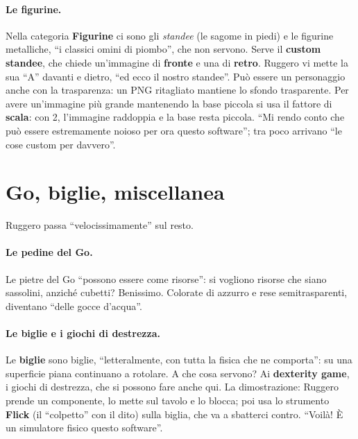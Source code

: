 \paragraph{Le figurine.} Nella categoria \textbf{Figurine} ci sono gli \emph{standee}
(le sagome in piedi) e le figurine metalliche, ``i classici omini di piombo'', che non
servono. Serve il \textbf{custom standee}, che chiede un'immagine di \textbf{fronte} e
una di \textbf{retro}. Ruggero vi mette la sua ``A'' davanti e dietro, ``ed ecco il
nostro standee''. Può essere un personaggio anche con la trasparenza: un PNG ritagliato
mantiene lo sfondo trasparente. Per avere un'immagine più grande mantenendo la base
piccola si usa il fattore di \textbf{scala}: con 2, l'immagine raddoppia e la base
resta piccola. ``Mi rendo conto che può essere estremamente noioso per ora questo
software''; tra poco arrivano ``le cose custom per davvero''.

\section{Go, biglie, miscellanea}
\label{a8:sec:misc}

Ruggero passa ``velocissimamente'' sul resto.

\paragraph{Le pedine del Go.} Le pietre del Go ``possono essere come risorse'': si
vogliono risorse che siano sassolini, anziché cubetti? Benissimo. Colorate di azzurro
e rese semitrasparenti, diventano ``delle gocce d'acqua''.

\paragraph{Le biglie e i giochi di destrezza.} Le \textbf{biglie} sono biglie,
``letteralmente, con tutta la fisica che ne comporta'': su una superficie piana
continuano a rotolare. A che cosa servono? Ai \textbf{dexterity game}, i giochi di
destrezza, che si possono fare anche qui. La dimostrazione: Ruggero prende un
componente, lo mette sul tavolo e lo blocca; poi usa lo strumento \textbf{Flick} (il
``colpetto'' con il dito) sulla biglia, che va a sbatterci contro. ``Voilà! È un
simulatore fisico questo software''.

